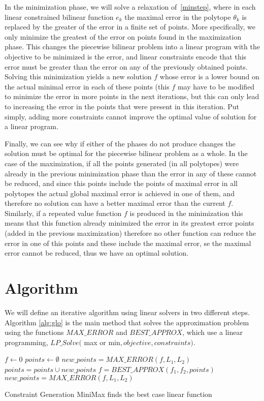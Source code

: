In the minimization phase, we will solve a relaxation of~\ref{minstep}, where in each linear constrained bilinear function $e_k$ the maximal error in the polytope $\theta_k$ is replaced by the greater of the error in a finite set of points. More specifically, we only minimize the greatest of the error on points found in the maximization phase. This changes the piecewise bilinear problem into a linear program with the objective to be minimized is the error, and linear constraints encode that this error must be greater than the error on any of the previously obtained points. Solving this minimization yields a new solution $f$ whose error is a lower bound on the actual minimal error in each of these points (this $f$ may have to be modified to minimize the error in more points in the next iterations, but this can only lead to increasing the error in the points that were present in this iteration. Put simply, adding more constraints cannot improve the optimal value of solution for a linear program.

Finally, we can see why if either of the phases do not produce changes the solution must be optimal for the piecewise bilinear problem as a whole. In the case of the maximization, if all the points generated (in all polytopes) were already in the previous minimization phase than the error in any of these cannot be reduced, and since this points include the points of maximal error in all polytopes the actual global maximal error is achieved in one of them, and therefore no solution can have a better maximal error than the current $f$. Similarly, if a repeated value function $f$ is produced in the minimization this means that this function already minimized the error in its greatest error points (added in the previous maximization) therefore no other function can reduce the error in one of this points and these include the maximal error, se the maximal error cannot be reduced, thus we have an optimal solution.

\section{Algorithm}
We will define an iterative algorithm using linear solvers in two different steps. Algorithm \ref{alg:glo} is the main method that solves the approximation problem using the functions $MAX\_ERROR$ and $BEST\_APPROX$, which use a linear programming, $LP\_Solve($ max or min$, objective, constraints)$.

\begin{algorithm}[!h]
\dontprintsemicolon
{}
$f \gets 0$\;
$points \gets \emptyset$\;
$new\_points = MAX\_ERROR(f, L_1,L_2)$\;
 {
	$points = points \cup new\_points$\;
	$f = BEST\_APPROX(f_1,f_2,points)$\;
	$new\_points = MAX\_ERROR(f, L_1,L_2)$\;}
\;
\caption{{\sc Constraint Generation MiniMax} finds the best case linear function}
\label{alg:glo}
\end{algorithm}

